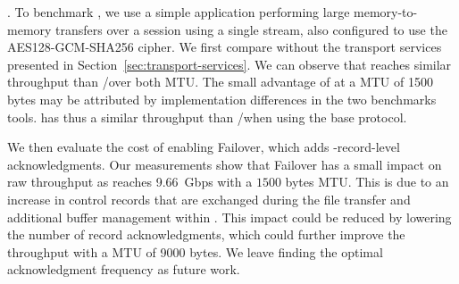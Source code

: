 \textbf{\tcpls}.
To benchmark \tcpls, we use a simple application performing large 
memory-to-memory transfers over a \tcpls session using a single stream, also
configured to use the AES128-GCM-SHA256 cipher. 
We first compare \tcpls without the transport services 
presented in Section~\ref{sec:transport-services}. We can observe that 
\tcpls reaches similar throughput than \tls/\tcp over both 
MTU. The small advantage of \tcpls at a MTU of 1500 bytes may be 
attributed by implementation differences in the two benchmarks tools. \tcpls 
has thus a similar throughput than \tcp/\tls when using the base 
protocol. %



We then evaluate the cost of enabling Failover, which adds \tcpls-record-level 
acknowledgments. %
Our measurements show that Failover has a small impact on raw throughput as
\tcpls reaches 9.66~Gbps with a $1500$ bytes MTU.
This is due to an increase in control records that are exchanged during the 
file transfer and additional buffer management within \tcpls.
This impact could be reduced by lowering the number of record acknowledgments,
which could further improve the throughput with a MTU of 9000 bytes. 
We leave finding the optimal acknowledgment frequency as future work.


